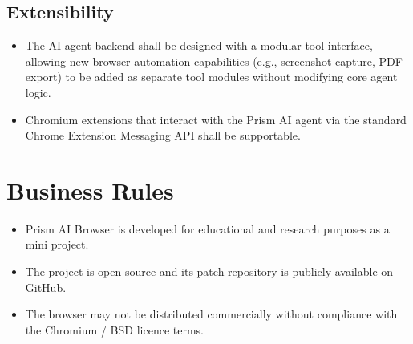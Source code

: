 \subsection{Extensibility}
\begin{itemize}[leftmargin=*]
    \item The AI agent backend shall be designed with a modular tool interface, allowing new browser automation capabilities (e.g., screenshot capture, PDF export) to be added as separate tool modules without modifying core agent logic.
    \item Chromium extensions that interact with the Prism AI agent via the standard Chrome Extension Messaging API shall be supportable.
\end{itemize}

\section{Business Rules}
\begin{itemize}[leftmargin=*]
    \item Prism AI Browser is developed for educational and research purposes as a mini project.
    \item The project is open-source and its patch repository is publicly available on GitHub.
    \item The browser may not be distributed commercially without compliance with the Chromium / BSD licence terms.
\end{itemize}

